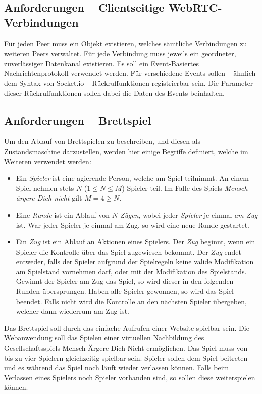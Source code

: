 \subsection{Anforderungen -- Clientseitige WebRTC-Verbindungen}
Für jeden Peer muss ein Objekt existieren, welches sämtliche Verbindungen zu weiteren Peers verwaltet. Für jede Verbindung muss jeweils ein geordneter, zuverlässiger Datenkanal existieren. Es soll ein Event-Basiertes Nachrichtenprotokoll verwendet werden. Für verschiedene Events sollen -- ähnlich dem Syntax von Socket.io -- Rückruffunktionen registrierbar sein. Die Parameter dieser Rückruffunktionen sollen dabei die Daten des Events beinhalten.

\subsection{Anforderungen -- Brettspiel}
Um den Ablauf von Brettspielen zu beschreiben, und diesen als Zustandsmaschine darzustellen, werden hier einige Begriffe definiert, welche im Weiteren verwendet werden:

\begin{itemize}
    \item Ein \textit{Spieler} ist eine agierende Person, welche am Spiel teilnimmt. An einem Spiel nehmen stets $N$ ($1 \leq N \leq M$) Spieler teil. Im Falle des Spiels \textit{Mensch ärgere Dich nicht} gilt $M = 4 \geq N$.
    
    \item Eine \textit{Runde} ist ein Ablauf von $N$ \textit{Zügen}, wobei jeder      \textit{Spieler} je einmal \textit{am Zug} ist. War jeder Spieler je einmal am Zug, so wird eine neue Runde gestartet.
    
    \item Ein \textit{Zug} ist ein Ablauf an Aktionen eines Spielers. Der \textit{Zug} beginnt, wenn ein Spieler die Kontrolle über das Spiel zugewiesen bekommt. Der \textit{Zug} endet entweder, falls der Spieler aufgrund der Spielregeln keine valide Modifikation am Spielstand vornehmen darf, oder mit der Modifikation des Spielstands. Gewinnt der Spieler am Zug das Spiel, so wird dieser in den folgenden Runden übersprungen. Haben alle Spieler gewonnen, so wird das Spiel beendet. Falls nicht wird die Kontrolle an den nächsten Spieler übergeben, welcher dann wiederrum am Zug ist.
\end{itemize}

Das Brettspiel soll durch das einfache Aufrufen einer Website spielbar sein. Die Webanwendung soll das Spielen einer virtuellen Nachbildung des Gesellschaftsspiels \glqq{}Mensch Ärgere Dich Nicht\grqq{} ermöglichen. Das Spiel muss von bis zu vier Spielern gleichzeitig spielbar sein. Spieler sollen dem Spiel beitreten und es während das Spiel noch läuft wieder verlassen können. Falls beim Verlassen eines Spielers noch Spieler vorhanden sind, so sollen diese weiterspielen können. 

